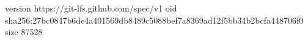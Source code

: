 version https://git-lfs.github.com/spec/v1
oid sha256:27bc0847b6de4a401569db8489c5088bef7a8369ad12f5bb34b2bcfa448706f0
size 87528
